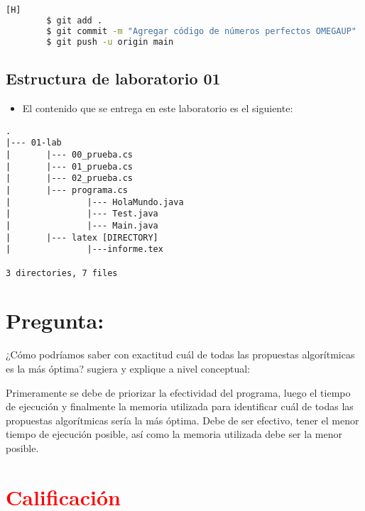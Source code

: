 \documentclass{article}
\begin{document}
	\subsection {}
	\begin{lstlisting}[language=bash,caption={Commit: Agregar código de números perfectos OMEGAUP}][H]
		$ git add .
		$ git commit -m "Agregar código de números perfectos OMEGAUP"			
		$ git push -u origin main
	\end{lstlisting}

	\subsection{Estructura de laboratorio 01}
	\begin{itemize}	
		\item El contenido que se entrega en este laboratorio es el siguiente:
	\end{itemize}
	
\begin{lstlisting}[style=ascii-tree]
.
|--- 01-lab
|   	|--- 00_prueba.cs
|   	|--- 01_prueba.cs
|		|--- 02_prueba.cs
|		|--- programa.cs
|				|--- HolaMundo.java
|				|--- Test.java
|				|--- Main.java
|		|--- latex [DIRECTORY]
|				|---informe.tex

3 directories, 7 files

\end{lstlisting}    
		
\section{Pregunta:}

¿Cómo podríamos saber con exactitud cuál de todas las propuestas algorítmicas es la más óptima? sugiera y explique a nivel conceptual:

Primeramente se debe de priorizar la efectividad del programa, luego el tiempo de ejecución y finalmente la memoria utilizada para identificar cuál de todas las propuestas algorítmicas sería la más óptima. Debe de ser efectivo, tener el menor tiempo de ejecución posible, así como la memoria utilizada debe ser la menor posible.\\
\section{\textcolor{red}{Calificación}}
\end{document}
